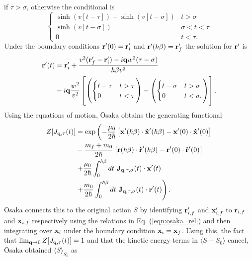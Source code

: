 if $\tau > \sigma$, otherwise the conditional is
\begin{equation}
    \begin{cases}
        \sinh(v[t-\tau]) - \sinh(v[t-\sigma]) & t > \sigma \\
        \sinh(v[t-\sigma]) & \sigma < t < \tau \\
        0 & t < \tau.
    \end{cases}
\label{eqn-223-21}
\end{equation}
Under the boundary conditions $\vb{r}'(0) = \vb{r}'_i$ and $\vb{r}'(\hbar\beta) = \vb{r}'_f$ the solution for $\vb{r}'$ is
\begin{equation}
    \begin{aligned}
    \vb{r}'(t) &= \vb{r}'_i + \frac{v^2 (\vb{r}'_f - \vb{r}'_i) - i\vb{q}w^2 (\tau - \sigma)}{\hbar\beta v^2} \\
    &- i\vb{q}\frac{w^2}{v^2} \left[
    \left(\begin{cases}
        t - \tau & t > \tau \\
        0 & t < \tau
    \end{cases}\right) - 
    \left(\begin{cases}
        t - \sigma & t > \sigma \\
        0 & t < \sigma.
    \end{cases}\right)
    \right].
    \end{aligned}
\label{eqn-223-22}
\end{equation}
Using the equations of motion, \=Osaka obtains the generating functional
\begin{equation}
    \begin{aligned}
         Z[J_{\vb{q},\tau}(t)] &= \exp \left(  -\frac{\mu_0}{2\hbar} \left[ \vb{x}'(\hbar\beta) \cdot \vb{\dot{x}'}(\hbar\beta) - \vb{x}'(0) \cdot \vb{\dot{x}'}(0) \right] \right. \\ 
        &- \frac{m_f + m_0}{2\hbar}  \left[ \vb{r}(\hbar\beta) \cdot \vb{\dot{r}'}(\hbar\beta) - \vb{r}'(0) \cdot \vb{\dot{r}'}(0) \right] \\
        &\left. + \frac{\mu_0}{2 \hbar} \int_0^{\hbar\beta} dt\ \vb{J}_{\vb{q}, \tau, \sigma}(t) \cdot \vb{x}'(t) \right. \\
        &\left. + \frac{m_0}{2 \hbar} \int_0^{\hbar\beta} dt\ \vb{J}_{\vb{q}, \tau, \sigma}(t) \cdot \vb{r}'(t) \right).
    \end{aligned}
\label{eqn-223-23}
\end{equation}
\=Osaka connects this to the original action $S$ by identifying $\vb{r}'_{i,f}$ and $\vb{x}'_{i,f}$ to $\vb{r}_{i,f}$ and $\vb{x}_{i,f}$ respectively using the relations in Eq. (\ref{eqn:osaka_rel}) and then integrating over $\vb{x}_i$ under the boundary condition $\vb{x}_i = \vb{x}_f$. Using this, the fact that $\lim_{\vb{q}\to 0}  Z[J_{\vb{q},\tau}(t)] = 1$ and that the kinetic energy terms in $\langle S - S_0 \rangle$ cancel, \=Osaka obtained $\langle S \rangle_{S_0}$ as
